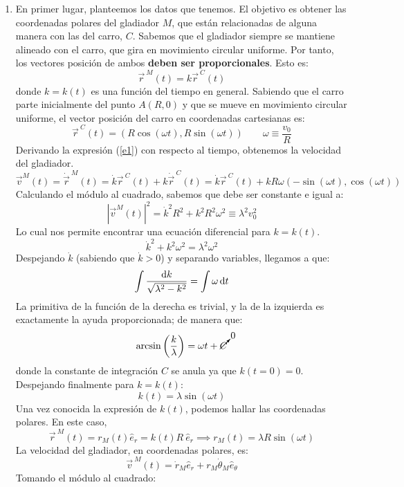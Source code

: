 \documentclass{article}
\begin{document}
\begin{enumerate}
    \item En primer lugar, planteemos los datos que tenemos. El objetivo es obtener las coordenadas polares del gladiador $M$, que están relacionadas de alguna manera con las del carro, $C$. Sabemos que el gladiador siempre se mantiene alineado con el carro, que gira en movimiento circular uniforme. Por tanto, los vectores posición de ambos \textbf{deben ser proporcionales}. Esto es:
    \begin{equation} \label{e1}
        \vec{r}^{\ M}(t)=k\vec{r}^{\ C}(t)
    \end{equation}
    donde $k=k(t)$ es una función del tiempo en general. Sabiendo que el carro parte inicialmente del punto $A(R,0)$ y que se mueve en movimiento circular uniforme, el vector posición del carro en coordenadas cartesianas es:
    $$
    \vec{r}^{\ C}(t)=(R\cos(\omega t),R\sin(\omega t)) \qquad \omega \equiv \frac{v_0}{R}
    $$
    Derivando la expresión (\ref{e1}) con respecto al tiempo, obtenemos la velocidad del gladiador.
    $$
    \vec{v}^M(t)=\dot{\vec{r}}^{\ M}(t)=\dot{k}\vec{r}^{\ C}(t)+k\dot{\vec{r}}^{\ C}(t)=\dot{k}\vec{r}^{\ C}(t)+kR\omega (-\sin(\omega t),\cos(\omega t))
    $$
    Calculando el módulo al cuadrado, sabemos que debe ser constante e igual a:
    $$
    |\vec{v}^M(t)|^2=\dot{k}^2R^2+k^2R^2\omega ^2\equiv \lambda ^2 v_0^2
    $$
    Lo cual nos permite encontrar una ecuación diferencial para $k=k(t)$.
    \begin{equation}
        \dot{k}^2+k^2\omega ^2= \lambda ^2 \omega ^2
    \end{equation}
    Despejando $\dot{k}$ (sabiendo que $\dot{k}>0$) y separando variables, llegamos a que:
    $$
    \int \frac{\odif{k}}{\sqrt{\lambda ^2-k^2}}=\int \omega \odif{t}
    $$
    La primitiva de la función de la derecha es trivial, y la de la izquierda es exactamente la ayuda proporcionada; de manera que:
    $$
    \arcsin{\left ( \frac{k}{\lambda } \right )}=\omega t + \cancelto{0}{C}
    $$
    donde la constante de integración $C$ se anula ya que $k(t=0)=0$. Despejando finalmente para $k=k(t)$:
    $$
    \boxed{k(t)=\lambda \sin(\omega t)}
    $$
    Una vez conocida la expresión de $k(t)$, podemos hallar las coordenadas polares. En este caso,
    $$
    \vec{r}^{\ M}(t)=r_M(t) \hat{e}_r=k(t)R\  \hat{e}_r\implies \boxed{r_M(t)=\lambda R \sin{(\omega t)}}
    $$
    La velocidad del gladiador, en coordenadas polares, es:
    $$
    \vec{v}^{\ M}(t)=\dot{r}_M \hat{e}_r+r_M \dot{\theta }_M \hat{e}_\theta 
    $$
    Tomando el módulo al cuadrado:

\end{enumerate}
\end{document}
